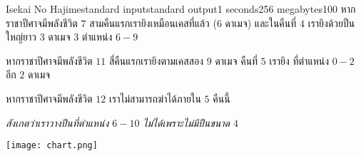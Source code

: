 \documentclass[11pt,a4paper]{article}
\begin{document}
\begin{problem}{Isekai No Hajime}{standard input}{standard output}{1 seconds}{256 megabytes}{100}
หากราชาปีศาจมีพลังชีวิต $7$ สามคืนแรกเรายิงเหมือนเคสที่แล้ว ($6$ ดาเมจ) และในคืนที่ $4$ เรายิงด้วยปืนใหญ่ยาว $3$ ดาเมจ $3$ ตำแหน่ง $6 - 9$

หากราชาปีศาจมีพลังชีวิต $11$ สี่คืนแรกเรายิงตามเคสสอง $9$ ดาเมจ คืนที่ $5$ เรายิง ที่ตำแหน่ง $0 - 2$ อีก $2$ ดาเมจ

หากราชาปีศาจมีพลังชีวิต $12$ เราไม่สามารถฆ่าได้ภายใน $5$ คืนนี้

\textit{สังเกตว่าเราวางปืนที่ตำแหน่ง $6 - 10$ ไม่ได้เพราะไม่มีปืนขนาด $4$}

\texttt{[image: chart.png]}

\end{problem}
\end{document}

